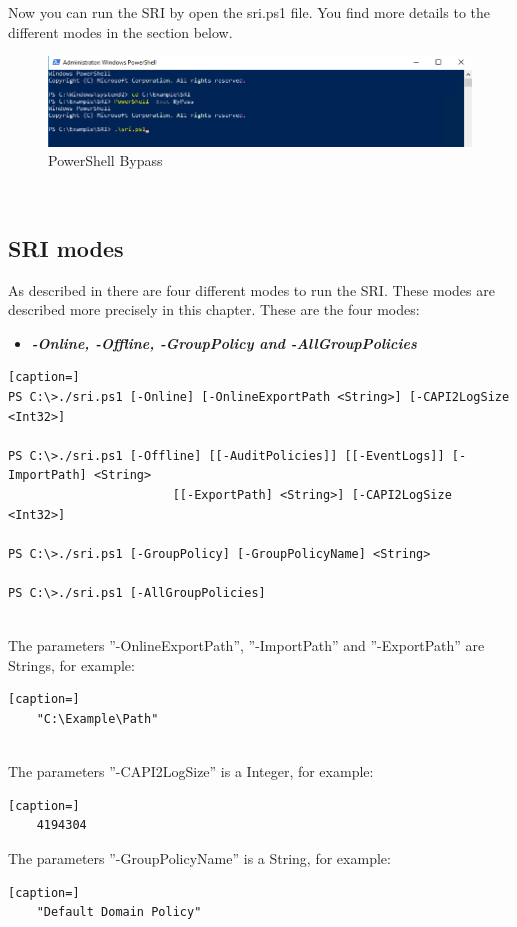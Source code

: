 Now you can run the SRI by open the sri.ps1 file. You find more details to the different modes in the section below.
\begin{figure}[H]
    \centering
    \includegraphics[width=1\linewidth]{assets/sri_ps1.png}
    \caption{PowerShell Bypass}
\end{figure} \ \\

\subsection{SRI modes}
As described in  there are four different modes to run the SRI. These modes are described more precisely in this chapter. These are the four modes:
\begin{itemize}
    \item \textbf{\textit{-Online, -Offline, -GroupPolicy and -AllGroupPolicies}}
\end{itemize}
\begin{lstlisting}[caption=]
PS C:\>./sri.ps1 [-Online] [-OnlineExportPath <String>] [-CAPI2LogSize <Int32>]

PS C:\>./sri.ps1 [-Offline] [[-AuditPolicies]] [[-EventLogs]] [-ImportPath] <String> 
                       [[-ExportPath] <String>] [-CAPI2LogSize <Int32>]

PS C:\>./sri.ps1 [-GroupPolicy] [-GroupPolicyName] <String>

PS C:\>./sri.ps1 [-AllGroupPolicies]
\end{lstlisting}
\clearpage \ \\
The parameters ''-OnlineExportPath'', ''-ImportPath'' and ''-ExportPath'' are Strings, for example:\ \\
\begin{lstlisting}[caption=]
    "C:\Example\Path"
\end{lstlisting} \ \\
The parameters ''-CAPI2LogSize'' is a Integer, for example:\ \\
\begin{lstlisting}[caption=]
    4194304
\end{lstlisting}
The parameters ''-GroupPolicyName'' is a String, for example:\ \\
\begin{lstlisting}[caption=]
    "Default Domain Policy"
\end{lstlisting}

